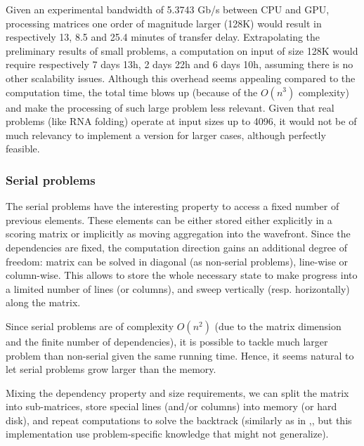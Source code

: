 Given an experimental bandwidth of 5.3743 Gb/s between CPU and GPU, processing matrices one order of magnitude larger (128K) would result in respectively 13, 8.5 and 25.4 minutes of transfer delay. Extrapolating the preliminary results of small problems, a computation on input of size 128K would require respectively 7 days 13h, 2 days 22h and 6 days 10h, assuming there is no other scalability issues. Although this overhead seems appealing compared to the computation time, the total time blows up (because of the  $O(n^3)$ complexity) and make the processing of such large problem less relevant. Given that real problems (like RNA folding) operate at input sizes up to 4096, it would not be of much relevancy to implement a version for larger cases, although perfectly feasible.

\subsubsection{Serial problems}
The serial problems have the interesting property to access a fixed number of previous elements. These elements can be either stored either explicitly in a scoring matrix or implicitly as moving aggregation into the wavefront. Since the dependencies are fixed, the computation direction gains an additional degree of freedom: matrix can be solved in diagonal (as non-serial problems), line-wise or column-wise. This allows to store the whole necessary state to make progress into a limited number of lines (or columns), and sweep vertically (resp. horizontally) along the matrix.

Since serial problems are of complexity $O(n^2)$ (due to the matrix dimension and the finite number of dependencies), it is possible to tackle much larger problem than non-serial given the same running time. Hence, it seems natural to let serial problems grow larger than the memory.

Mixing the dependency property and size requirements, we can split the matrix into sub-matrices, store special lines (and/or columns) into memory (or hard disk), and repeat computations to solve the backtrack (similarly as in \cite{swat_gpu},\cite{swat_mega}, but this implementation use problem-specific knowledge that might not generalize).

